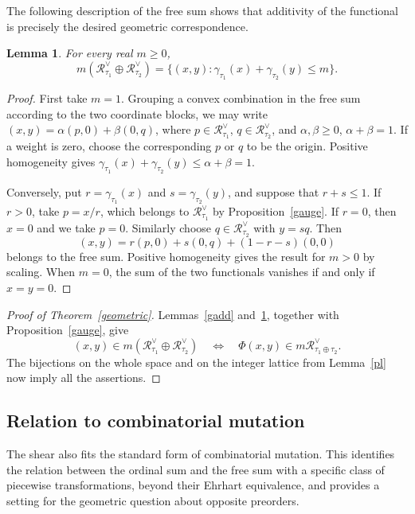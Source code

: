 \documentclass[11pt,reqno]{amsart}
\numberwithin{equation}{section}
\newtheorem{lemma}[theorem]{Lemma}
\theoremstyle{definition}
\theoremstyle{remark}
\theoremstyle{definition}
\newcommand{\Rpoly}[1]{\mathcal R_{#1}^{\vee}}
\begin{document}
The following description of the free sum shows that additivity of the functional is precisely the desired geometric correspondence.
\begin{lemma}\label{freesum}
For every real $m\ge0$,
\[
 m(\Rpoly{\tau_1}\oplus\Rpoly{\tau_2})
   =\{(x,y):\gamma_{\tau_1}(x)+\gamma_{\tau_2}(y)\le m\}.
\]
\end{lemma}
\begin{proof}
First take $m=1$. Grouping a convex combination in the free sum according to the two coordinate blocks, we may write
$(x,y)=\alpha(p,0)+\beta(0,q)$, where $p\in\Rpoly{\tau_1}$, $q\in\Rpoly{\tau_2}$, and $\alpha,\beta\ge0$, $\alpha+\beta=1$. If a weight is zero, choose the corresponding $p$ or $q$ to be the origin. Positive homogeneity gives
$\gamma_{\tau_1}(x)+\gamma_{\tau_2}(y)\le\alpha+\beta=1$.

Conversely, put $r=\gamma_{\tau_1}(x)$ and $s=\gamma_{\tau_2}(y)$, and suppose that $r+s\le1$. If $r>0$, take $p=x/r$, which belongs to $\Rpoly{\tau_1}$ by Proposition~\ref{gauge}. If $r=0$, then $x=0$ and we take $p=0$. Similarly choose $q\in\Rpoly{\tau_2}$ with $y=sq$. Then
\[
 (x,y)=r(p,0)+s(0,q)+(1-r-s)(0,0)
\]
belongs to the free sum. Positive homogeneity gives the result for $m>0$ by scaling. When $m=0$, the sum of the two functionals vanishes if and only if $x=y=0$.
\end{proof}

\begin{proof}[Proof of Theorem~\ref{geometric}]
Lemmas~\ref{gadd} and~\ref{freesum}, together with Proposition~\ref{gauge}, give
\[
 (x,y)\in m(\Rpoly{\tau_1}\oplus\Rpoly{\tau_2})
 \quad\Longleftrightarrow\quad
 \Phi(x,y)\in m\Rpoly{\tau_1\oplus\tau_2}.
\]
The bijections on the whole space and on the integer lattice from Lemma~\ref{pl} now imply all the assertions.
\end{proof}

\subsection{Relation to combinatorial mutation}\label{subsec:mutation}
The shear also fits the standard form of combinatorial mutation. This identifies the relation between the ordinal sum and the free sum with a specific class of piecewise transformations, beyond their Ehrhart equivalence, and provides a setting for the geometric question about opposite preorders.
\end{document}
